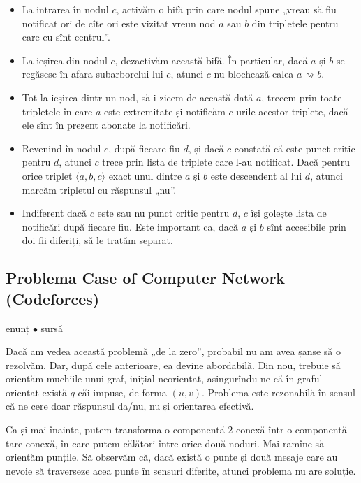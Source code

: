 \documentclass[../main.tex]{subfiles}
\begin{document}
\begin{itemize}
  \item La intrarea în nodul $c$, activăm o bifă prin care nodul spune „vreau să fiu notificat ori de cîte ori este vizitat vreun nod $a$ sau $b$ din tripletele pentru care eu sînt centrul”.

  \item La ieșirea din nodul $c$, dezactivăm această bifă. În particular, dacă $a$ și $b$ se regăsesc în afara subarborelui lui $c$, atunci $c$ nu blochează calea $a \rightsquigarrow b$.

  \item Tot la ieșirea dintr-un nod, să-i zicem de această dată $a$, trecem prin toate tripletele în care $a$ este extremitate și notificăm $c$-urile acestor triplete, dacă ele sînt în prezent abonate la notificări.

  \item Revenind în nodul $c$, după fiecare fiu $d$, și dacă $c$ constată că este punct critic pentru $d$, atunci $c$ trece prin lista de triplete care l-au notificat. Dacă pentru orice triplet $\langle a, b, c\rangle$ exact unul dintre $a$ și $b$ este descendent al lui $d$, atunci marcăm tripletul cu răspunsul „nu”.

  \item Indiferent dacă $c$ este sau nu punct critic pentru $d$, $c$ își golește lista de notificări după fiecare fiu. Este important ca, dacă $a$ și $b$ sînt accesibile prin doi fii diferiți, să le tratăm separat.
\end{itemize}

\subsection{Problema Case of Computer Network (Codeforces)}
\label{problem:case-of-computer-network}

\href{https://codeforces.com/contest/555/problem/E}{enunț}
$\bullet$
\hyperref[code:case-of-computer-network]{sursă}

Dacă am vedea această problemă „de la zero”, probabil nu am avea șanse să o rezolvăm. Dar, după cele anterioare, ea devine abordabilă. Din nou, trebuie să orientăm muchiile unui graf, inițial neorientat, asingurîndu-ne că în graful orientat există $q$ căi impuse, de forma $(u, v)$. Problema este rezonabilă în sensul că ne cere doar răspunsul da/nu, nu și orientarea efectivă.

Ca și mai înainte, putem transforma o componentă 2-conexă într-o componentă tare conexă, în care putem călători între orice două noduri. Mai rămîne să orientăm punțile. Să observăm că, dacă există o punte și două mesaje care au nevoie să traverseze acea punte în sensuri diferite, atunci problema nu are soluție.
\end{document}
